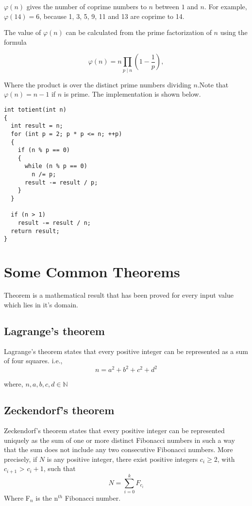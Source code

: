 \documentclass[twoside,12pt,a4paper,english]{book}
\theoremstyle{definition}
\theoremstyle{problemstyle}
\begin{document}
 $\varphi(n)$
gives the number of coprime numbers to $n$
between $1$ and $n$.
For example, $\varphi(14)=6$,
because 1, 3, 5, 9, 11 and 13
are coprime to 14.

The value of $\varphi(n)$ can be calculated
from the prime factorization of $n$
using the formula

\begin{equation}
\varphi (n)=n\prod _{p\mid n}\left(1-{\frac {1}{p}}\right),
\end{equation}

Where the product is over the distinct prime numbers dividing $n$.Note that $\varphi(n)=n-1$ if $n$ is prime. The implementation is shown below.
\begin{lstlisting}
int totient(int n)
{
  int result = n;
  for (int p = 2; p * p <= n; ++p)
  {
    if (n % p == 0)
    {
      while (n % p == 0)
        n /= p;
      result -= result / p;
    }
  }

  if (n > 1)
    result -= result / n;
  return result;
}
\end{lstlisting}

\section{Some Common Theorems}
Theorem is a mathematical result that has been proved for every input value which lies in it's domain.

\subsection{Lagrange’s theorem}
Lagrange’s theorem states that every positive integer can be represented as a
sum of four squares. i.e.,
$$n = a^2 + b^2 + c^2 + d^2$$

where, $n,a,b,c,d \in \mathbb{N}$
\subsection{Zeckendorf's theorem}
Zeckendorf's theorem states that every positive integer can be represented uniquely as the sum of one or more distinct Fibonacci numbers in such a way that the sum does not include any two consecutive Fibonacci numbers. More precisely, if $N$ is any positive integer, there exist positive integers $c_i \geq 2$, with $c_{i+1}$ > $c_i + 1$, such that
\begin{equation}
N=\sum _{{i=0}}^{k}F_{{c_{i}}}
\end{equation}
Where F$_{n}$ is the n$^{th}$ Fibonacci number.
\end{document}
